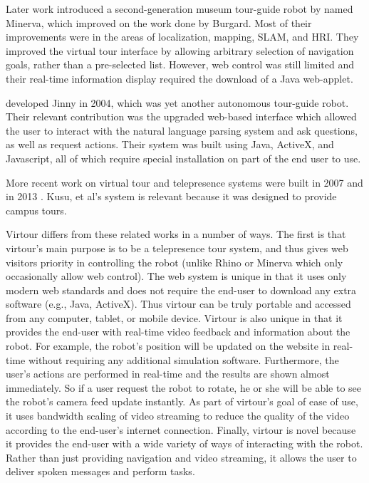 \documentclass[
  oneside,
  11pt, a4paper,
  footinclude=true,
  headinclude=true,
  cleardoublepage=empty
]{article}
\begin{document}
Later work introduced a second-generation museum tour-guide robot by
\cite{thrun1999} named Minerva, which improved on the work done by Burgard.
Most of their improvements were in the areas of localization, mapping, SLAM,
and HRI.  They improved the virtual tour interface by allowing arbitrary
selection of navigation goals, rather than a pre-selected list. However, web
control was still limited and their real-time information display required the
download of a Java web-applet.

\cite{kim2004} developed Jinny in 2004, which was yet another autonomous
tour-guide robot. Their relevant contribution was the upgraded web-based
interface which allowed the user to interact with the natural language parsing
system and ask questions, as well as request actions. Their system was built
using Java, ActiveX, and Javascript, all of which require special installation
on part of the end user to use.

More recent work on virtual tour and telepresence systems were built in 2007
\cite{michaud2007} and in 2013 \cite{kusu2013}. Kusu, et al's system is relevant
because it was designed to provide campus tours.

Virtour differs from these related works in a number of ways. The first is that
virtour's main purpose is to be a telepresence tour system, and thus gives web
visitors priority in controlling the robot (unlike Rhino or Minerva which only
occasionally allow web control). The web system is unique in that it uses only
modern web standards and does not require the end-user to download any extra
software (e.g., Java, ActiveX). Thus virtour can be truly portable and accessed
from any computer, tablet, or mobile device. Virtour is also unique in that it
provides the end-user with real-time video feedback and information about the
robot. For example, the robot's position will be updated on the website in
real-time without requiring any additional simulation software. Furthermore,
the user's actions are performed in real-time and the results are shown almost
immediately. So if a user request the robot to rotate, he or she will be able
to see the robot's camera feed update instantly.  As part of virtour's goal of
ease of use, it uses bandwidth scaling of video streaming to reduce the quality
of the video according to the end-user's internet connection. Finally, virtour
is novel because it provides the end-user with a wide variety of ways of
interacting with the robot. Rather than just providing navigation and video
streaming, it allows the user to deliver spoken messages and perform tasks.
\end{document}
